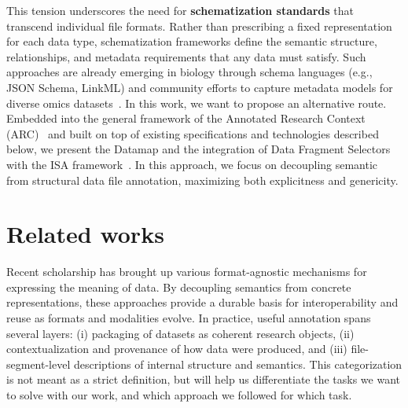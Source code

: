 \documentclass{jib}
\begin{document}
This tension underscores the need for \textbf{schematization standards} that transcend individual file formats. Rather than prescribing a fixed representation for each data type, schematization frameworks define the semantic structure, relationships, and metadata requirements that any data must satisfy. Such approaches are already emerging in biology through schema languages (e.g., JSON Schema, LinkML) and community efforts to capture metadata models for diverse omics datasets~\cite{bandrowski2021obi, moxon2021linkml}. In this work, we want to propose an alternative route. Embedded into the general framework of the Annotated Research Context (ARC)~\cite{weil2023plantdatahub,dataplant2025arc} and built on top of existing specifications and technologies described below, we present the Datamap and 
the integration of Data Fragment Selectors~\cite{rfc7111} with the ISA framework~\cite{roccaserra2012isa}. In this approach, we focus on decoupling semantic from structural data file annotation, maximizing both explicitness and genericity.


%
%
\section{Related works}

Recent scholarship has brought up various format-agnostic mechanisms for expressing the meaning of data. By decoupling semantics from concrete representations, these approaches provide a durable basis for interoperability and reuse as formats and modalities evolve. In practice, useful annotation spans several layers: (i) packaging of datasets as coherent research objects, (ii) contextualization and provenance of how data were produced, and (iii) file-segment-level descriptions of internal structure and semantics. This categorization is not meant as a strict definition, but will help us differentiate the tasks we want to solve with our work, and which approach we followed for which task.
\end{document}
